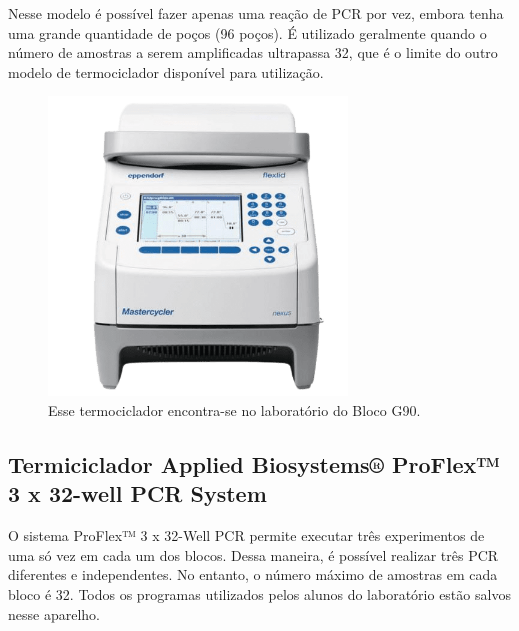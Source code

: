 \documentclass[
  letterpaper,
  DIV=11,
  numbers=noendperiod]{scrreprt}
\begin{document}
Nesse modelo é possível fazer apenas uma reação de PCR por vez, embora
tenha uma grande quantidade de poços (96 poços). É utilizado geralmente
quando o número de amostras a serem amplificadas ultrapassa 32, que é o
limite do outro modelo de termociclador disponível para utilização.

\begin{figure}

{\centering \includegraphics[width=\textwidth,height=3.125in]{figures/equipamentos/termociclador_eppendorf.png}

}

\caption{Esse termociclador encontra-se no laboratório do Bloco G90.}

\end{figure}

\hypertarget{termiciclador-applied-biosystems-proflex-3-x-32-well-pcr-system}{%
\subsection{Termiciclador Applied Biosystems® ProFlex™ 3 x 32-well PCR
System}\label{termiciclador-applied-biosystems-proflex-3-x-32-well-pcr-system}}

O sistema ProFlex™ 3 x 32-Well PCR permite executar três experimentos de
uma só vez em cada um dos blocos. Dessa maneira, é possível realizar
três PCR diferentes e independentes. No entanto, o número máximo de
amostras em cada bloco é 32. Todos os programas utilizados pelos alunos
do laboratório estão salvos nesse aparelho.
\end{document}
